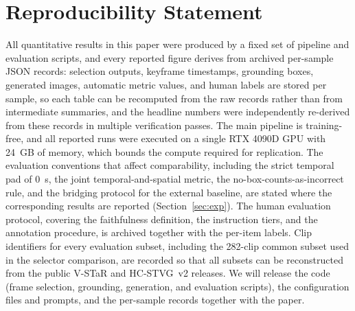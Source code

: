 
\section*{Reproducibility Statement}

All quantitative results in this paper were produced by a fixed set of pipeline and evaluation scripts, and every reported figure derives from archived per-sample JSON records: selection outputs, keyframe timestamps, grounding boxes, generated images, automatic metric values, and human labels are stored per sample, so each table can be recomputed from the raw records rather than from intermediate summaries, and the headline numbers were independently re-derived from these records in multiple verification passes. The main pipeline is training-free, and all reported runs were executed on a single RTX 4090D GPU with 24~GB of memory, which bounds the compute required for replication. The evaluation conventions that affect comparability, including the strict temporal pad of 0~s, the joint temporal-and-spatial metric, the no-box-counts-as-incorrect rule, and the bridging protocol for the external baseline, are stated where the corresponding results are reported (Section~\ref{sec:exp}). The human evaluation protocol, covering the faithfulness definition, the instruction tiers, and the annotation procedure, is archived together with the per-item labels. Clip identifiers for every evaluation subset, including the 282-clip common subset used in the selector comparison, are recorded so that all subsets can be reconstructed from the public V-STaR and HC-STVG~v2 releases. We will release the code (frame selection, grounding, generation, and evaluation scripts), the configuration files and prompts, and the per-sample records together with the paper.

